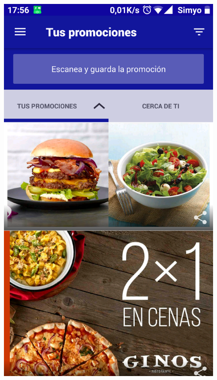 \documentclass[twoside]{report}
\begin{document}
\begin{figure}[H]
\begin{center}
\includegraphics[scale=0.10]{images/restaurantes/vips0.png}

\end{center}
\end{figure}
\end{document}
